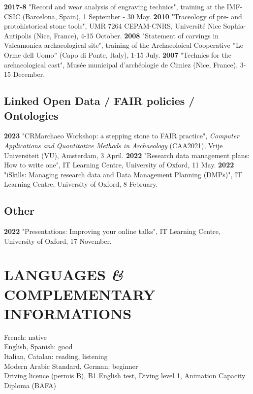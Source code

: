 \documentclass{article}
\begin{document}
\textbf{2017-8 } "Record and wear analysis of engraving technics", training at the IMF-CSIC (Barcelona, Spain), 1 September - 30 May.
\smallbreak
\textbf{2010 } "Traceology of pre- and protohistorical stone tools", UMR 7264 CEPAM-CNRS, Universit\'{e} Nice Sophia-Antipolis (Nice, France), 4-15 October.
\smallbreak
\textbf{2008 } "Statement of carvings in Valcamonica archaeological site", training of the Archaeoloical Cooperative ''Le Orme dell Uomo'' (Capo di Ponte, Italy), 1-15 July.
\smallbreak
\textbf{2007 } "Technics for the archaeological cast", Mus\'{e}e municipal d'arch\'{e}ologie de Cimiez (Nice, France), 3-15 December.

\subsection*{Linked Open Data / FAIR policies / Ontologies}

\textbf{2023 }"CRMarchaeo Workshop: a stepping stone to FAIR practice", \textit{Computer Applications and Quantitative Methods in Archaeology} (CAA2021), Vrije Universiteit (VU), Amsterdam, 3 April.
\smallbreak
\textbf{2022 }"Research data management plans: How to write one", IT Learning Centre, University of Oxford, 11 May.
\smallbreak
\textbf{2022 }"iSkills: Managing research data and Data Management Planning (DMPs)", IT Learning Centre, University of Oxford, 8 February.
\subsection*{Other}

\textbf{2022 }"Presentations: Improving your online talks", IT Learning Centre, University of Oxford, 17 November.
\smallbreak

\section*{LANGUAGES \textit{\&} COMPLEMENTARY INFORMATIONS}

French: native \\
English, Spanish: good \\
Italian, Catalan: reading, listening \\
Modern Arabic Standard, German: beginner \\

Driving licence (permis B), B1 English test, Diving level 1, Animation Capacity Diploma (BAFA)
\end{document}
